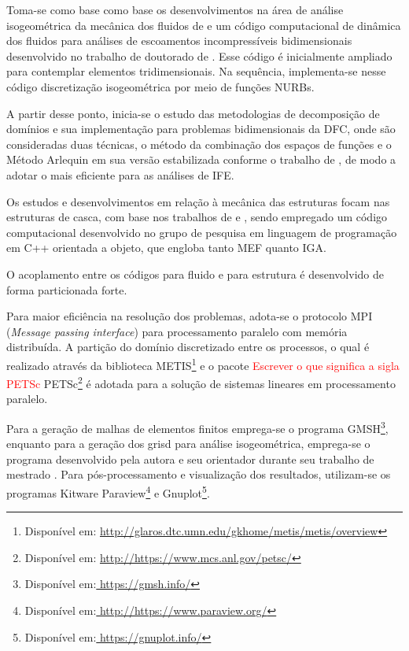 \documentclass[tese_patricia.tex]{subfiles}
\begin{document}
Toma-se como base como base os desenvolvimentos na área de análise isogeométrica da mecânica dos fluidos de   e um código computacional de dinâmica dos fluidos para análises de escoamentos incompressíveis bidimensionais desenvolvido no trabalho de doutorado de . Esse código é inicialmente ampliado para contemplar elementos tridimensionais. Na sequência, implementa-se nesse código discretização isogeométrica por meio de funções NURBs.

A partir desse ponto, inicia-se o estudo das metodologias de decomposição de domínios e sua implementação para problemas bidimensionais da DFC, onde são consideradas duas técnicas, o método da combinação dos espaços de funções \cite{RosicleyMestrado,RosicleyArtigo} e o Método Arlequin em sua versão estabilizada conforme o trabalho de , de modo a adotar o mais eficiente para as análises de IFE.

Os estudos e desenvolvimentos em relação à mecânica das estruturas focam nas estruturas de casca, com base nos trabalhos de  e , sendo empregado um código computacional desenvolvido no grupo de pesquisa em linguagem de programação em C++ orientada a objeto, que engloba tanto MEF quanto IGA.

O acoplamento entre os códigos para fluido e para estrutura é desenvolvido de forma particionada forte.

Para maior eficiência na resolução dos problemas, adota-se o protocolo MPI (\textit{Message passing interface}) para processamento paralelo com memória distribuída. A partição do domínio discretizado entre os processos, o qual é realizado através da biblioteca METIS\footnote{Disponível em: \url{http://glaros.dtc.umn.edu/gkhome/metis/metis/overview}} e o pacote \textcolor{red}{Escrever o que significa a sigla PETSc} PETSc\footnote{Disponível em: \url{http://https://www.mcs.anl.gov/petsc/}} é adotada para a solução de sistemas lineares  em processamento paralelo.

Para a geração de malhas de elementos finitos emprega-se o programa GMSH\footnote{Disponível em:\url{ https://gmsh.info/}}, enquanto para a  geração dos grisd para análise isogeométrica, emprega-se o programa desenvolvido pela autora e seu orientador durante seu trabalho de mestrado \cite{Tonon:2016}. Para pós-processamento e visualização dos resultados, utilizam-se os programas Kitware Paraview\footnote{Disponível em:\url{ http://https://www.paraview.org/}} e  Gnuplot\footnote{Disponível em:\url{ https://gnuplot.info/}}. 
\end{document}
